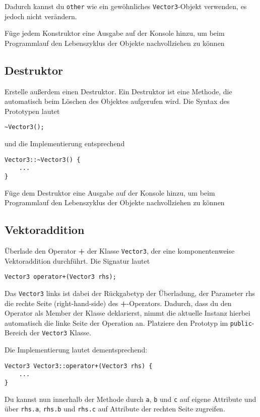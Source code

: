 Dadurch kannst du \texttt{other} wie ein gewöhnliches \texttt{Vector3}-Objekt verwenden, es jedoch nicht verändern.

Füge jedem Konstruktor eine Ausgabe auf der Konsole hinzu, um beim Programmlauf den Lebenszyklus der Objekte nachvollziehen zu können

\subsection{Destruktor}

Erstelle außerdem einen Destruktor.
Ein Destruktor ist eine Methode, die automatisch beim Löschen des Objektes aufgerufen wird. Die Syntax des Prototypen lautet
\begin{lstlisting}
~Vector3();
\end{lstlisting}

und die Implementierung entsprechend
\begin{lstlisting}
Vector3::~Vector3() {
	...
}
\end{lstlisting}

Füge dem Destruktor eine Ausgabe auf der Konsole hinzu, um beim Programmlauf den Lebenszyklus der Objekte nachvollziehen zu können

\subsection{Vektoraddition}
Überlade den Operator \textbf{+} der Klasse \texttt{Vector3}, der eine komponentenweise Vektoraddition durchführt.
Die Signatur lautet
\begin{lstlisting}
Vector3 operator+(Vector3 rhs);
\end{lstlisting}
Das \texttt{Vector3} links ist dabei der Rückgabetyp der Überladung, der Parameter rhs die rechte Seite (\glqq right-hand-side\grqq{}) des \textbf{+}-Operators.
Dadurch, dass du den Operator als Member der Klasse deklarierst, nimmt die aktuelle Instanz hierbei automatisch die linke Seite der Operation an.
Platziere den Prototyp im \texttt{public}-Bereich der \texttt{Vector3} Klasse.

Die Implementierung lautet dementsprechend:
\begin{lstlisting}
Vector3 Vector3::operator+(Vector3 rhs) {
	...
}
\end{lstlisting}

Du kannst nun innerhalb der Methode durch \texttt{a}, \texttt{b} und \texttt{c} auf eigene Attribute und über  \texttt{rhs.a}, \texttt{rhs.b} und \texttt{rhs.c} auf Attribute der rechten Seite zugreifen.

